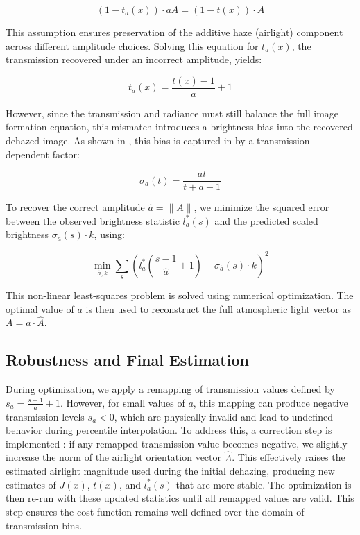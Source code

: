 \documentclass[conference]{IEEEtran}
\begin{document}
\begin{equation}
\label{matching_airlight}
(1 - t_a(x)) \cdot aA = (1 - t(x)) \cdot A
\end{equation}

This assumption ensures preservation of the additive haze (airlight) component across different amplitude choices. Solving this equation for \( t_a(x) \), the transmission recovered under an incorrect amplitude, yields:

\begin{equation}
\label{recovered_transmission }
t_a(x) = \frac{t(x) - 1}{a} + 1
\end{equation}

However, since the transmission and radiance must still balance the full image formation equation, this mismatch introduces a brightness bias into the recovered dehazed image. As shown in \cite{airlight}, this bias is captured in by a transmission-dependent factor:

\begin{equation}
\label{brightness_bias}
\sigma_a(t) = \frac{a t}{t + a - 1}
\end{equation}

To recover the correct amplitude \( \hat{a} = \|A\| \), we minimize the squared error between the observed brightness statistic \( l^*_a(s) \) and the predicted scaled brightness \( \sigma_a(s) \cdot k \), using:

\begin{equation}
\label{optimisation}
\min_{\hat{a}, k} \sum_s \left( l^*_a\left( \frac{s - 1}{\hat{a}} + 1 \right) - \sigma_\hat{a}(s) \cdot k \right)^2
\end{equation}

This non-linear least-squares problem is solved using numerical optimization. The optimal value of \( a \) is then used to reconstruct the full atmospheric light vector as \( A = a \cdot \hat{A} \).


\subsection{Robustness and Final Estimation}


During optimization, we apply a remapping of transmission values defined by \( s_a = \frac{s - 1}{a} + 1 \). However, for small values of \( a \), this mapping can produce negative transmission levels \( s_a < 0 \), which are physically invalid and lead to undefined behavior during percentile interpolation. To address this, a correction step is implemented \cite{airlight}: if any remapped transmission value becomes negative, we slightly increase the norm of the airlight orientation vector \( \hat{A} \). This effectively raises the estimated airlight magnitude used during the initial dehazing, producing new estimates of \( J(x) \), \( t(x) \), and \( l^*_a(s) \) that are more stable. The optimization is then re-run with these updated statistics until all remapped values are valid. This step ensures the cost function remains well-defined over the domain of transmission bins.
\end{document}

